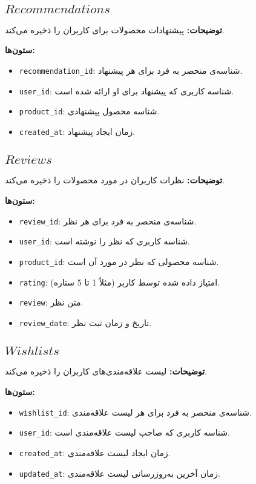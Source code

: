\documentclass[12pt]{article}
\begin{document}
\subsection{\(Recommendations\)}

\textbf{توضیحات:} پیشنهادات محصولات برای کاربران را ذخیره می‌کند.

\textbf{ستون‌ها:}
\begin{itemize}
    \item \texttt{recommendation\_id}: شناسه‌ی منحصر به فرد برای هر پیشنهاد.
    \item \texttt{user\_id}: شناسه کاربری که پیشنهاد برای او ارائه شده است.
    \item \texttt{product\_id}: شناسه محصول پیشنهادی.
    \item \texttt{created\_at}: زمان ایجاد پیشنهاد.
\end{itemize}

\subsection{\(Reviews\)}

\textbf{توضیحات:} نظرات کاربران در مورد محصولات را ذخیره می‌کند.

\textbf{ستون‌ها:}
\begin{itemize}
    \item \texttt{review\_id}: شناسه‌ی منحصر به فرد برای هر نظر.
    \item \texttt{user\_id}: شناسه کاربری که نظر را نوشته است.
    \item \texttt{product\_id}: شناسه محصولی که نظر در مورد آن است.
    \item \texttt{rating}: امتیاز داده شده توسط کاربر (مثلاً 1 تا 5 ستاره).
    \item \texttt{review}: متن نظر.
    \item \texttt{review\_date}: تاریخ و زمان ثبت نظر.
\end{itemize}

\subsection{\(Wishlists\)}

\textbf{توضیحات:} لیست علاقه‌مندی‌های کاربران را ذخیره می‌کند.

\textbf{ستون‌ها:}
\begin{itemize}
    \item \texttt{wishlist\_id}: شناسه‌ی منحصر به فرد برای هر لیست علاقه‌مندی.
    \item \texttt{user\_id}: شناسه کاربری که صاحب لیست علاقه‌مندی است.
    \item \texttt{created\_at}: زمان ایجاد لیست علاقه‌مندی.
    \item \texttt{updated\_at}: زمان آخرین به‌روزرسانی لیست علاقه‌مندی.
\end{itemize}
\end{document}
